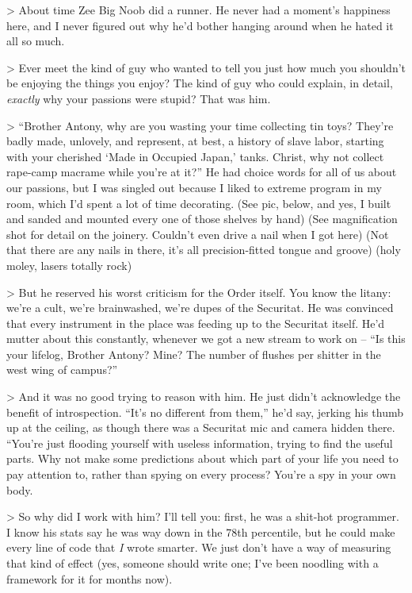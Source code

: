 \tb

> About time Zee Big Noob did a runner. He never had a moment's 
happiness here, and I never figured out why he'd bother hanging around 
when he hated it all so much.

> Ever meet the kind of guy who wanted to tell you just how much you 
shouldn't be enjoying the things you enjoy? The kind of guy who could 
explain, in detail, \emph{exactly} why your passions were stupid? That 
was him.

> “Brother Antony, why are you wasting your time collecting tin toys? 
They're badly made, unlovely, and represent, at best, a history of 
slave labor, starting with your cherished `Made in Occupied Japan,' 
tanks. Christ, why not collect rape-camp macrame while you're at it?” 
He had choice words for all of us about our passions, but I was singled 
out because I liked to extreme program in my room, which I'd spent a 
lot of time decorating. (See pic, below, and yes, I built and sanded 
and mounted every one of those shelves by hand) (See magnification shot 
for detail on the joinery. Couldn't even drive a nail when I got here) 
(Not that there are any nails in there, it's all precision-fitted 
tongue and groove) (holy moley, lasers totally rock)

> But he reserved his worst criticism for the Order itself. You know 
the litany: we're a cult, we're brainwashed, we're dupes of the 
Securitat. He was convinced that every instrument in the place was 
feeding up to the Securitat itself. He'd mutter about this constantly, 
whenever we got a new stream to work on -- “Is this your lifelog, 
Brother Antony? Mine? The number of flushes per shitter in the west 
wing of campus?”

> And it was no good trying to reason with him. He just didn't 
acknowledge the benefit of introspection. “It's no different from 
them,” he'd say, jerking his thumb up at the ceiling, as though there 
was a Securitat mic and camera hidden there. “You're just flooding 
yourself with useless information, trying to find the useful parts. Why 
not make some predictions about which part of your life you need to pay 
attention to, rather than spying on every process? You're a spy in your 
own body.

> So why did I work with him? I'll tell you: first, he was a shit-hot 
programmer. I know his stats say he was way down in the 78th 
percentile, but he could make every line of code that \emph{I} wrote 
smarter. We just don't have a way of measuring that kind of effect 
(yes, someone should write one; I've been noodling with a framework for 
it for months now).

